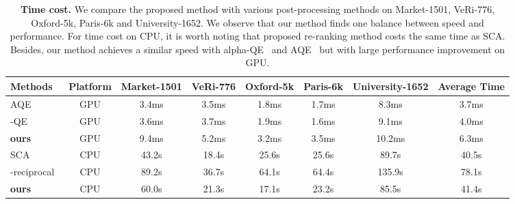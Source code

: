 \documentclass[10pt,twocolumn,letterpaper]{article}
\begin{document}
\setlength{\tabcolsep}{14pt}
\begin{table*}[]
\begin{center}
\scriptsize
\begin{tabular}{l|c|c|c|c|c|c|c}
\toprule[1pt]
Methods & Platform& Market-1501 & VeRi-776 &Oxford-5k & Paris-6k & University-1652 & Average Time
 \\ \midrule[0.5pt]
AQE~\cite{chum2007total} & GPU & 3.4ms & 3.5ms   & 1.8ms & 1.7ms & 8.3ms & 3.7ms\\
-QE~\cite{radenovic2018fine} & GPU & 3.6ms & 3.7ms  & 1.9ms &1.6ms & 9.1ms & 4.0ms\\
\textbf{ours} & GPU  & 9.4ms & 5.2ms    &3.2ms & 3.5ms & 10.2ms & 6.3ms\\
\hline
SCA~\cite{bai2016sparse} & CPU & 43.2s & 18.4s   & 25.6s & 25.6s &89.7s  &40.5s \\
-reciprocal~\cite{zhong2017re} & CPU & 89.2s &  36.7s  &64.1s& 64.4s & 135.9s & 78.1s
\\
\textbf{ours} & CPU & 60.0s & 21.3s & 17.1s& 23.2s & 85.5s & 41.4s \\
\bottomrule[1pt]
\end{tabular}
\end{center}
\caption{\textbf{Time cost.} We compare the proposed method with various post-processing methods on Market-1501, VeRi-776, Oxford-5k, Paris-6k and University-1652. We observe that our method finds one balance between speed and performance. For time cost on CPU, it is worth noting that proposed re-ranking method costs
the same time as SCA. Besides, our method achieves a similar speed with alpha-QE~\cite{radenovic2018fine} and AQE~\cite{chum2007total} but with large performance improvement on GPU.
}
\label{table:time}
\end{table*}
\end{document}
